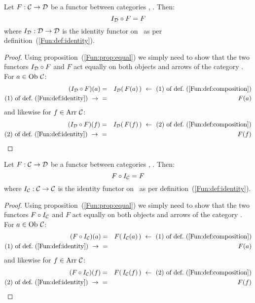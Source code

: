 \begin{prop}\label{Fun:prop:left:identity}
    Let $F:\mbox{$\cal C$}\to\mbox{$\cal D$}$ be a functor between categories \Cat, \Dat. Then:
        \[
            I_{\cal D}\circ F = F
        \]
    where $I_{\cal D}:\mbox{$\cal D$}\to\mbox{$\cal D$}$ is the identity functor on \Dat\ as per
    definition~(\ref{Fun:def:identity}).
\end{prop}
\begin{proof}
    Using proposition~(\ref{Fun:prop:equal}) we simply need to show that
    the two functors $I_{\cal D}\circ F$ and $F$ act equally on both objects 
    and arrows of the category \Cat. For $a\in\mbox{\rm Ob}\ \mbox{$\cal C$}$:
        \begin{eqnarray*}(I_{\cal D}\circ F)(a)
            &=&I_{\cal D}(\,F(a)\,)
            \ \leftarrow\ \mbox{$(1)$ of def.~(\ref{Fun:def:composition})}\\
            \mbox{$(1)$ of def.~(\ref{Fun:def:identity})}\ \to\ 
            &=&F(a)
        \end{eqnarray*}
    and likewise for $f\in\mbox{\rm Arr}\ \mbox{$\cal C$}$:
        \begin{eqnarray*}(I_{\cal D}\circ F)(f)
            &=&I_{\cal D}(\,F(f)\,)
            \ \leftarrow\ \mbox{$(2)$ of def.~(\ref{Fun:def:composition})}\\
            \mbox{$(2)$ of def.~(\ref{Fun:def:identity})}\ \to\ 
            &=&F(f)
        \end{eqnarray*}
\end{proof}

\begin{prop}\label{Fun:prop:right:identity}
    Let $F:\mbox{$\cal C$}\to\mbox{$\cal D$}$ be a functor between categories \Cat, \Dat. Then:
        \[
            F\circ I_{\cal C} = F
        \]
    where $I_{\cal C}:\mbox{$\cal C$}\to\mbox{$\cal C$}$ is the identity functor on \Cat\ as per
    definition~(\ref{Fun:def:identity}).
\end{prop}
\begin{proof}
    Using proposition~(\ref{Fun:prop:equal}) we simply need to show that
    the two functors $F\circ I_{\cal C}$ and $F$ act equally on both objects 
    and arrows of the category \Cat. For $a\in\mbox{\rm Ob}\ \mbox{$\cal C$}$:
        \begin{eqnarray*}(F\circ I_{\cal C})(a)
            &=&F(\,I_{\cal C}(a)\,)
            \ \leftarrow\ \mbox{$(1)$ of def.~(\ref{Fun:def:composition})}\\
            \mbox{$(1)$ of def.~(\ref{Fun:def:identity})}\ \to\ 
            &=&F(a)
        \end{eqnarray*}
    and likewise for $f\in\mbox{\rm Arr}\ \mbox{$\cal C$}$:
        \begin{eqnarray*}(F\circ I_{\cal C})(f)
            &=&F(\,I_{\cal C}(f)\,)
            \ \leftarrow\ \mbox{$(2)$ of def.~(\ref{Fun:def:composition})}\\
            \mbox{$(2)$ of def.~(\ref{Fun:def:identity})}\ \to\ 
            &=&F(f)
        \end{eqnarray*}
\end{proof}

